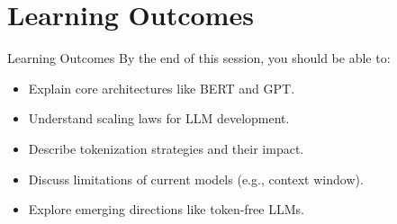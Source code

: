 \section{Learning Outcomes}
\begin{frame}{Learning Outcomes}
    By the end of this session, you should be able to:

    \begin{itemize}
        \setlength{\itemsep}{0.5em}
        \item Explain core architectures like BERT and GPT.
        \item Understand scaling laws for LLM development.
        \item Describe tokenization strategies and their impact.
        \item Discuss limitations of current models (e.g., context window).
        \item Explore emerging directions like token-free LLMs.
    \end{itemize}
\end{frame}